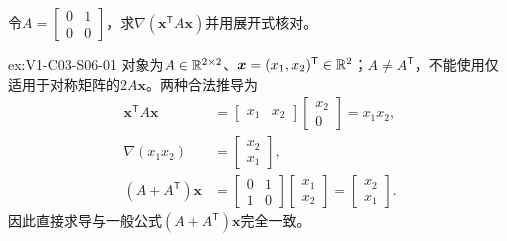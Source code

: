\begin{SLChapterExercisePairSection}
\begin{exercise}[非对称二次型]\label{ex:V1-C03-S06-01}
令$A=\begin{bmatrix}0&1\\0&0\end{bmatrix}$，求$\nabla(\boldsymbol{x}^{\mathsf T}A\boldsymbol{x})$并用展开式核对。
\end{exercise}
\label{sol:V1-C03-S06-01}
\begin{chapterexercisesolution}{ex:V1-C03-S06-01}
对象为$A\in\mathbb{R}^{2\times2}$、$\boldsymbol x=(x_1,x_2)^{\mathsf T}\in\mathbb{R}^2$；$A\ne A^{\mathsf T}$，不能使用仅适用于对称矩阵的$2A\boldsymbol x$。两种合法推导为
\[
\begin{aligned}
\boldsymbol x^{\mathsf T}A\boldsymbol x
&=\begin{bmatrix}x_1&x_2\end{bmatrix}
\begin{bmatrix}x_2\\0\end{bmatrix}=x_1x_2,\\
\nabla(x_1x_2)&=\begin{bmatrix}x_2\\x_1\end{bmatrix},\\
(A+A^{\mathsf T})\boldsymbol x
&=\begin{bmatrix}0&1\\1&0\end{bmatrix}
\begin{bmatrix}x_1\\x_2\end{bmatrix}
=\begin{bmatrix}x_2\\x_1\end{bmatrix}.
\end{aligned}
\]
因此直接求导与一般公式$(A+A^{\mathsf T})\boldsymbol x$完全一致。
\end{chapterexercisesolution}


\end{SLChapterExercisePairSection}
